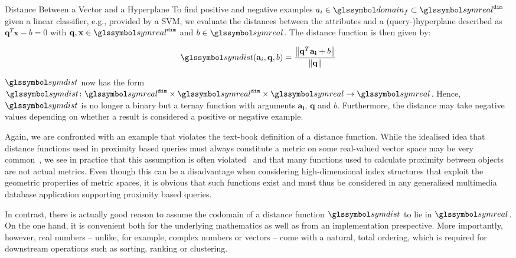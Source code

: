 \begin{example}[label=example:svmdistance]{Distance Between a Vector and a Hyperplane}{}
    To find positive and negative examples $a_{i} \in \domain_f \subset \symreal^{\mathtt{dim}}$ given a linear classifier, e.g., provided by a SVM, we evaluate the distances between the attributes and a (query-)hyperplane described as $\mathbf{q}^T\mathbf{x} - b = 0$ with $\mathbf{q},\mathbf{x} \in \symreal^{\mathtt{dim}}$ and $b \in \symreal$. The distance function is then given by:

    \begin{equation}
        \symdist (\mathbf{a}_i, \mathbf{q}, b) = \frac{\left\|\mathbf{q}^T \mathbf{a_i} + b \right\|}{\left\|\mathbf{q}\right\|}
    \end{equation}
    
    $\symdist$ now has the form $\symdist \colon \symreal^{\mathtt{dim}} \times \symreal^{\mathtt{dim}} \times \symreal \to \symreal$. Hence, $\symdist$ is no longer a binary but a ternay function with arguments $\mathbf{a_{i}}$, $\mathbf{q}$ and $b$. Furthermore, the distance may take negative values depending on whether a result is considered a positive or negative example.
\end{example}

Again, we are confronted with an example that violates the text-book definition of a distance function. While the idealised idea that distance functions used in proximity based queries must always constitute a metric on some real-valued vector space may be very common~\cite{Zezula:2006Similarity}, we see in practice that this assumption is often violated~\cite{Skopal:2011Nonmetric,Bernhauer:2019Nonmetric} and that many functions used to calculate proximity between objects are not actual metrics. Even though this can be a disadvantage when considering high-dimensional index structures that exploit the geometric properties of metric spaces, it is obvious that such functions exist and must thus be considered in any generalised multimedia database application supporting proximity based queries. 

In contrast, there is actually good reason to assume the codomain of a distance function  $\symdist$ to lie in $\symreal$. On the one hand, it is convenient both for the underlying mathematics as well as from an implementation prespective. More importantly, however, real numbers -- unlike, for example, complex numbers or vectors -- come with a natural, total ordering, which is required for downstream operations such as sorting, ranking or clustering.

